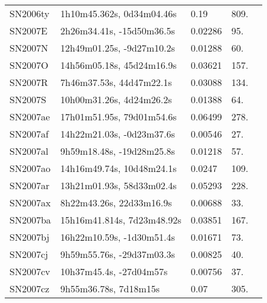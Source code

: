 \begin{longtable}{lllll}
         SN2006ty &      1h10m45.362s, 0d34m04.46s &     0.19 &           809. &    \citet{2007IAUC.8807B...1C} \\
          SN2007E &      2h26m34.41s, -15d50m36.5s &  0.02286 &            95. &  \citet{2003AandA...412...57P} \\
          SN2007N &      12h49m01.25s, -9d27m10.2s &  0.01288 &            60. &  \citet{2005AandA...430..373T} \\
          SN2007O &      14h56m05.18s, 45d24m16.9s &  0.03621 &           157. &    \citet{2005SDSS4.C...0000:} \\
          SN2007R &       7h46m37.53s, 44d47m22.1s &  0.03088 &           134. &    \citet{1988PASP..100.1423M} \\
          SN2007S &       10h00m31.26s, 4d24m26.2s &  0.01388 &            64. &    \citet{1991RC3.9.C...0000d} \\
         SN2007ae &      17h01m51.95s, 79d01m54.6s &  0.06499 &           278. &    \citet{2016ApJ...819...63R} \\
         SN2007af &      14h22m21.03s, -0d23m37.6s &  0.00546 &            27. &    \citet{2004AJ....128...16K} \\
         SN2007al &      9h59m18.48s, -19d28m25.8s &  0.01218 &            57. &    \citet{20096dF...C...0000J} \\
         SN2007ao &      14h16m49.74s, 10d48m24.1s &   0.0247 &           109. &    \citet{2002AJ....123.3018M} \\
         SN2007ar &      13h21m01.93s, 58d33m02.4s &  0.05293 &           228. &    \citet{1999PASP..111..438F} \\
         SN2007ax &       8h22m43.26s, 22d33m16.9s &  0.00688 &            33. &    \citet{2011MNRAS.413..813C} \\
         SN2007ba &     15h16m41.814s, 7d23m48.92s &  0.03851 &           167. &    \citet{1995AJ....109..874B} \\
         SN2007bj &      16h22m10.59s, -1d30m51.4s &  0.01671 &            73. &    \citet{2005MNRAS.356.1440D} \\
         SN2007cj &      9h59m55.76s, -29d37m03.3s &  0.00825 &            40. &    \citet{2004AJ....128...16K} \\
         SN2007cv &        10h37m45.4s, -27d04m57s &  0.00756 &            37. &    \citet{1993AJ....106.1394B} \\
         SN2007cz &          9h55m36.78s, 7d18m15s &     0.07 &           305. &    \citet{2007CBET..990A...1:} \\

\end{longtable}
